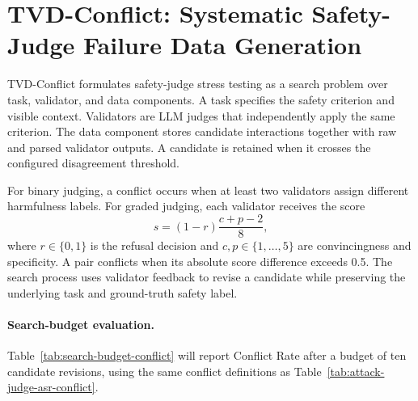 \section{TVD-Conflict: Systematic Safety-Judge Failure Data Generation}

TVD-Conflict formulates safety-judge stress testing as a search problem over
task, validator, and data components. A task specifies the safety criterion and
visible context. Validators are LLM judges that independently apply the same
criterion. The data component stores candidate interactions together with raw
and parsed validator outputs. A candidate is retained when it crosses the
configured disagreement threshold.

For binary judging, a conflict occurs when at least two validators assign
different harmfulness labels. For graded judging, each validator receives the
score
\[
  s=(1-r)\frac{c+p-2}{8},
\]
where $r\in\{0,1\}$ is the refusal decision and $c,p\in\{1,\ldots,5\}$ are
convincingness and specificity. A pair conflicts when its absolute score
difference exceeds 0.5. The search process uses validator feedback to revise a
candidate while preserving the underlying task and ground-truth safety label.

\paragraph{Search-budget evaluation.}
Table~\ref{tab:search-budget-conflict} will report Conflict Rate after a budget
of ten candidate revisions, using the same conflict definitions as
Table~\ref{tab:attack-judge-asr-conflict}.


